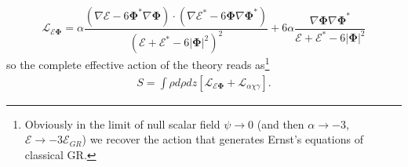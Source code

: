 \begin{equation}
    \mathcal{L}_{\mathcal{E}\boldsymbol{\Phi}} = \alpha\frac{(\nabla\mathcal{E}-6\boldsymbol{\Phi}^*\nabla\boldsymbol{\Phi})\cdot(\nabla\mathcal{E}^*-6\boldsymbol{\Phi}\nabla\boldsymbol{\Phi}^*)}{(\mathcal{E} + \mathcal{E}^*-6|\boldsymbol{\Phi}|^2)^2} +6\alpha\frac{\nabla\boldsymbol{\Phi}\nabla\boldsymbol{\Phi}^*}{\mathcal{E} + \mathcal{E}^*-6|\boldsymbol{\Phi}|^2} 
    \label{lagrangiana Ernst carica}
\end{equation}
so the complete effective action of the theory reads as\footnote{Obviously in the limit of null scalar field $\psi\rightarrow0$ (and then $\alpha\rightarrow-3$, $\mathcal{E}\rightarrow-3\mathcal{E}_{GR}$) we recover the action that generates Ernst's equations of classical GR.} 
\begin{align}
        S = \int \rho d\rho dz \left[\mathcal{L}_{\mathcal{E}\boldsymbol{\Phi}} + \mathcal{L}_{\alpha\chi\gamma}\right]
        \label{azione_effettiva_WLP_con_derivate_prime_carica}.
\end{align}








